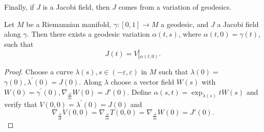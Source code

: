 \documentclass{ctexart}
\begin{document}
Finally, if $J$ is a Jacobi field, then $J$ comes from a variation of geodesics.
\begin{proposition}
  Let $M$ be a Riemannian manifold, $\gamma:[0,1] \rightarrow M$ a geodesic, and $J$ a Jacobi field along $\gamma$. Then there exists 
  a geodesic variation $\alpha(t, s)$, where $\alpha(t, 0)=\gamma(t)$, such that 
  $$
  J(t)=V \left|_{\alpha(t, 0)}\right..
  $$
\end{proposition}
\begin{proof}[Proof]
  Choose a curve $\lambda(s), s \in(-\varepsilon, \varepsilon)$ in $M$ such that $\lambda(0)=$ $\gamma(0), \lambda^{\prime}(0)=J(0)$. 
  Along $\lambda$ choose a vector field $W(s)$ with $W(0)=\gamma^{\prime}(0), \nabla_{\frac{\partial}{\partial s}}W(0)=J'(0)$. 
  Define $\alpha(s, t)=\exp _{\lambda(s)} t W(s)$ and verify that $V(0,0)=\lambda^{\prime}(0)=J(0)$ and
  $$
  \nabla_{\frac{\partial}{\partial t}} V(0,0)=\nabla_{\frac{\partial}{\partial s}} T(0,0)=\nabla_{\frac{\partial}{\partial s}}W(0)=J'(0).
  $$ 
\end{proof}

\end{document}
